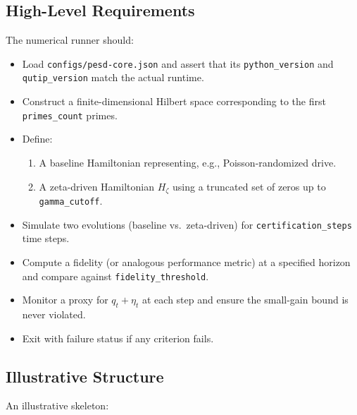 \documentclass[11pt]{article}
\begin{document}
\subsection{High-Level Requirements}

The numerical runner should:

\begin{itemize}[nosep]
  \item Load \texttt{configs/pesd-core.json} and assert that its \texttt{python\_version} and \texttt{qutip\_version} match the actual runtime.
  \item Construct a finite-dimensional Hilbert space corresponding to the first \texttt{primes\_count} primes.
  \item Define:
  \begin{enumerate}[nosep]
    \item A baseline Hamiltonian representing, e.g., Poisson-randomized drive.
    \item A zeta-driven Hamiltonian \(H_\zeta\) using a truncated set of zeros up to \texttt{gamma\_cutoff}.
  \end{enumerate}
  \item Simulate two evolutions (baseline vs.\ zeta-driven) for \texttt{certification\_steps} time steps.
  \item Compute a fidelity (or analogous performance metric) at a specified horizon and compare against \texttt{fidelity\_threshold}.
  \item Monitor a proxy for \(q_t + \eta_t\) at each step and ensure the small-gain bound is never violated.
  \item Exit with failure status if any criterion fails.
\end{itemize}

\subsection{Illustrative Structure}

An illustrative skeleton:
\end{document}
